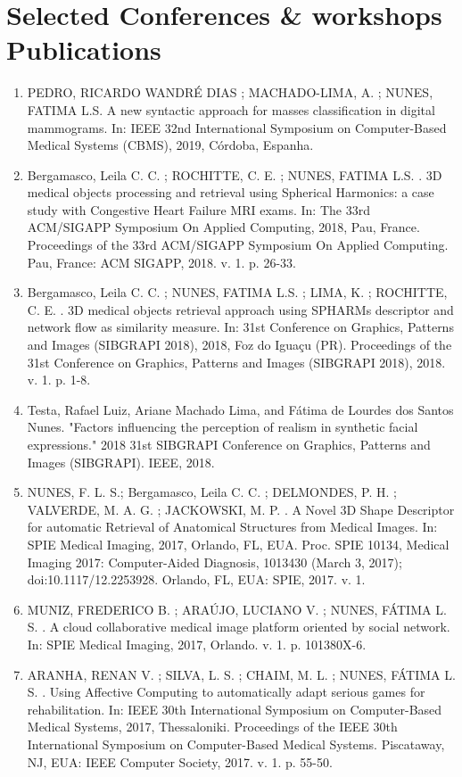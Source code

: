 \documentclass[11pt,a4paper,sans]{moderncv} %
\begin{document}
\section{Selected Conferences \& workshops Publications}
\footnotesize
\begin{enumerate}
    \item PEDRO, RICARDO WANDRÉ DIAS ; MACHADO-LIMA, A. ; NUNES, FATIMA L.S. A new syntactic approach for masses classification in digital mammograms. In: IEEE 32nd International Symposium on Computer-Based Medical Systems (CBMS), 2019, Córdoba, Espanha. 
    \item Bergamasco, Leila C. C. ; ROCHITTE, C. E. ; NUNES, FATIMA L.S. . 3D medical objects processing and retrieval using Spherical Harmonics: a case study with Congestive Heart Failure MRI exams. In: The 33rd ACM/SIGAPP Symposium On Applied Computing, 2018, Pau, France. Proceedings of the 33rd ACM/SIGAPP Symposium On Applied Computing. Pau, France: ACM SIGAPP, 2018. v. 1. p. 26-33.
    \item Bergamasco, Leila C. C. ; NUNES, FATIMA L.S. ; LIMA, K. ; ROCHITTE, C. E. . 3D medical objects retrieval approach using SPHARMs descriptor and network flow as similarity measure. In: 31st Conference on Graphics, Patterns and Images (SIBGRAPI 2018), 2018, Foz do Iguaçu (PR). Proceedings of the 31st Conference on Graphics, Patterns and Images (SIBGRAPI 2018), 2018. v. 1. p. 1-8.
    \item Testa, Rafael Luiz, Ariane Machado Lima, and Fátima de Lourdes dos Santos Nunes. "Factors influencing the perception of realism in synthetic facial expressions." 2018 31st SIBGRAPI Conference on Graphics, Patterns and Images (SIBGRAPI). IEEE, 2018.
    \item NUNES, F. L. S.; Bergamasco, Leila C. C. ; DELMONDES, P. H. ; VALVERDE, M. A. G. ; JACKOWSKI, M. P. . A Novel 3D Shape Descriptor for automatic Retrieval of Anatomical Structures from Medical Images. In: SPIE Medical Imaging, 2017, Orlando, FL, EUA. Proc. SPIE 10134, Medical Imaging 2017: Computer-Aided Diagnosis, 1013430 (March 3, 2017); doi:10.1117/12.2253928. Orlando, FL, EUA: SPIE, 2017. v. 1.
    \item MUNIZ, FREDERICO B. ; ARAÚJO, LUCIANO V. ; NUNES, FÁTIMA L. S. . A cloud collaborative medical image platform oriented by social network. In: SPIE Medical Imaging, 2017, Orlando. v. 1. p. 101380X-6.
    \item ARANHA, RENAN V. ; SILVA, L. S. ; CHAIM, M. L. ; NUNES, FÁTIMA L. S. . Using Affective Computing to automatically adapt serious games for rehabilitation. In: IEEE 30th International Symposium on Computer-Based Medical Systems, 2017, Thessaloniki. Proceedings of the IEEE 30th International Symposium on Computer-Based Medical Systems. Piscataway, NJ, EUA: IEEE Computer Society, 2017. v. 1. p. 55-50.

\end{enumerate}
\end{document}
